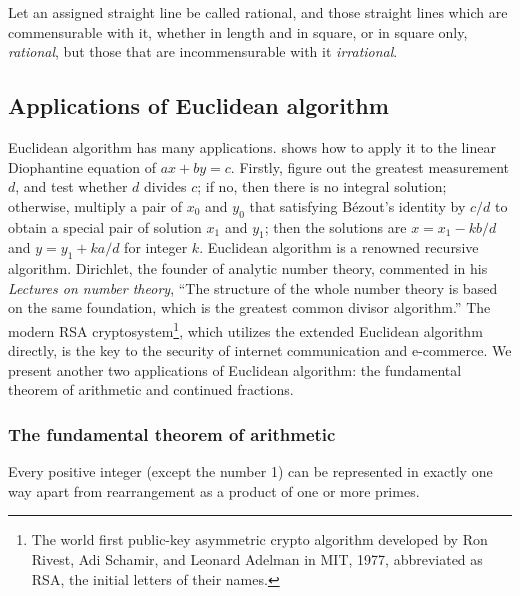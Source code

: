 \documentclass[b5paper]{article}
\begin{document}
\begin{definition}
Let an assigned straight line be called rational, and those straight lines which are commensurable with it, whether in length and in square, or in square only, \emph{rational}, but those that are incommensurable with it \emph{irrational}.
\end{definition}

\subsection{Applications of Euclidean algorithm}

Euclidean algorithm has many applications.  shows how to apply it to the linear Diophantine equation of $ax + by = c$. Firstly, figure out the greatest measurement $d$, and test whether $d$ divides $c$; if no, then there is no integral solution; otherwise, multiply a pair of $x_0$ and $y_0$ that satisfying Bézout's identity by $c/d$ to obtain a special pair of solution $x_1$ and $y_1$; then the solutions are $x = x_1 - k b / d$ and $y = y_1 + k a / d$ for integer $k$. Euclidean algorithm is a renowned recursive algorithm. Dirichlet, the founder of analytic number theory, commented in his \emph{Lectures on number theory}, \enquote{The structure of the whole number theory is based on the same foundation, which is the greatest common divisor algorithm.} The modern RSA cryptosystem\footnote{The world first public-key asymmetric crypto algorithm developed by Ron Rivest, Adi Schamir, and Leonard Adelman in MIT, 1977, abbreviated as RSA, the initial letters of their names.}, which utilizes the extended Euclidean algorithm directly, is the key to the security of internet communication and e-commerce. We present another two applications of Euclidean algorithm: the fundamental theorem of arithmetic and continued fractions.

\label{sec:fundamental-theorem-of-arithmetic}
\subsubsection{The fundamental theorem of arithmetic}
\begin{theorem}
Every positive integer (except the number 1) can be represented in exactly one way apart from rearrangement as a product of one or more primes.
\end{theorem}
\end{document}
